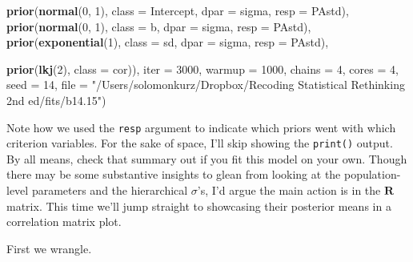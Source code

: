 \documentclass[]{article}
\newenvironment{Shaded}{\begin{snugshade}}{\end{snugshade}}
\newcommand{\DataTypeTok}[1]{\textcolor[rgb]{0.13,0.29,0.53}{#1}}
\newcommand{\DecValTok}[1]{\textcolor[rgb]{0.00,0.00,0.81}{#1}}
\newcommand{\KeywordTok}[1]{\textcolor[rgb]{0.13,0.29,0.53}{\textbf{#1}}}
\newcommand{\NormalTok}[1]{#1}
\newcommand{\StringTok}[1]{\textcolor[rgb]{0.31,0.60,0.02}{#1}}
\begin{document}
\begin{Shaded}
\begin{Highlighting}[]
                \KeywordTok{prior}\NormalTok{(}\KeywordTok{normal}\NormalTok{(}\DecValTok{0}\NormalTok{, }\DecValTok{1}\NormalTok{), }\DataTypeTok{class =}\NormalTok{ Intercept, }\DataTypeTok{dpar =}\NormalTok{ sigma, }\DataTypeTok{resp =}\NormalTok{ PAstd),}
                \KeywordTok{prior}\NormalTok{(}\KeywordTok{normal}\NormalTok{(}\DecValTok{0}\NormalTok{, }\DecValTok{1}\NormalTok{), }\DataTypeTok{class =}\NormalTok{ b, }\DataTypeTok{dpar =}\NormalTok{ sigma, }\DataTypeTok{resp =}\NormalTok{ PAstd),}
                \KeywordTok{prior}\NormalTok{(}\KeywordTok{exponential}\NormalTok{(}\DecValTok{1}\NormalTok{), }\DataTypeTok{class =}\NormalTok{ sd, }\DataTypeTok{dpar =}\NormalTok{ sigma, }\DataTypeTok{resp =}\NormalTok{ PAstd),}

                \KeywordTok{prior}\NormalTok{(}\KeywordTok{lkj}\NormalTok{(}\DecValTok{2}\NormalTok{), }\DataTypeTok{class =}\NormalTok{ cor)),}
      \DataTypeTok{iter =} \DecValTok{3000}\NormalTok{, }\DataTypeTok{warmup =} \DecValTok{1000}\NormalTok{, }\DataTypeTok{chains =} \DecValTok{4}\NormalTok{, }\DataTypeTok{cores =} \DecValTok{4}\NormalTok{,}
      \DataTypeTok{seed =} \DecValTok{14}\NormalTok{,}
      \DataTypeTok{file =} \StringTok{"/Users/solomonkurz/Dropbox/Recoding Statistical Rethinking 2nd ed/fits/b14.15"}\NormalTok{)}
\end{Highlighting}
\end{Shaded}

Note how we used the \texttt{resp} argument to indicate which priors
went with which criterion variables. For the sake of space, I'll skip
showing the \texttt{print()} output. By all means, check that summary
out if you fit this model on your own. Though there may be some
substantive insights to glean from looking at the population-level
parameters and the hierarchical \(\sigma\)'s, I'd argue the main action
is in the \(\mathbf R\) matrix. This time we'll jump straight to
showcasing their posterior means in a correlation matrix plot.

First we wrangle.
\end{document}

